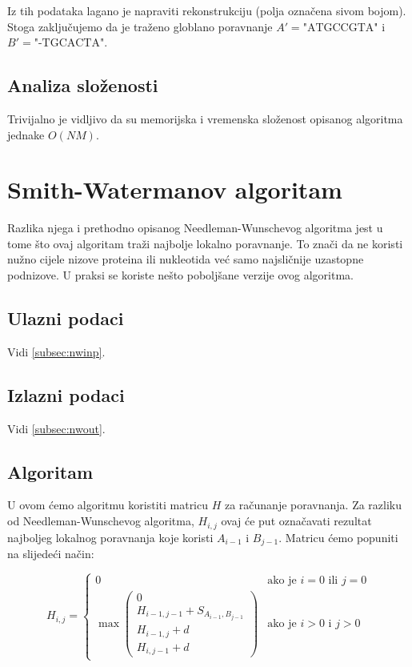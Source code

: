 \documentclass[times, utf8, zavrsni]{fer}
\begin{document}
Iz tih podataka lagano je napraviti rekonstrukciju (polja označena sivom
bojom). Stoga zaključujemo da je traženo globlano poravnanje
$A' = \mbox{"ATGCCGTA"}$ i $B' = \mbox{"-TGCACTA"}$.

\subsection{Analiza složenosti}
Trivijalno je vidljivo da su memorijska i vremenska složenost opisanog algoritma 
jednake $O(NM)$. 



\section{Smith-Watermanov algoritam}
\label{sec:swalg}
Razlika njega i prethodno opisanog Needleman-Wunschevog algoritma jest u tome
što ovaj algoritam traži najbolje lokalno poravnanje. To znači da ne koristi
nužno cijele nizove proteina ili nukleotida već samo najsličnije uzastopne
podnizove. U praksi se koriste nešto poboljšane verzije ovog algoritma.

\subsection{Ulazni podaci}
Vidi \autoref{subsec:nwinp}.

\subsection{Izlazni podaci}
Vidi \autoref{subsec:nwout}.

\subsection{Algoritam}
\label{subsec:swalg}
U ovom ćemo algoritmu koristiti matricu $H$ za računanje poravnanja.
Za razliku od Needleman-Wunschevog algoritma, $H_{i,j}$ ovaj će put
označavati rezultat
najboljeg lokalnog poravnanja koje koristi $A_{i-1}$ i $B_{j-1}$.
Matricu ćemo popuniti na slijedeći način:

$$
H_{i,j} =
\left\{ \begin{array}{ll}
	0 & \mbox{ako je } i=0 \mbox{ ili } j=0 \\
	\max \left( \begin{array}{l}
		0 \\
		H_{i-1,j-1} + S_{A_{i-1}, B_{j-1}} \\
		H_{i-1, j} + d \\
		H_{i, j-1} + d
	\end{array} \right) & \mbox{ako je } i>0 \mbox{ i } j>0
\end{array} \right.
$$
\end{document}
